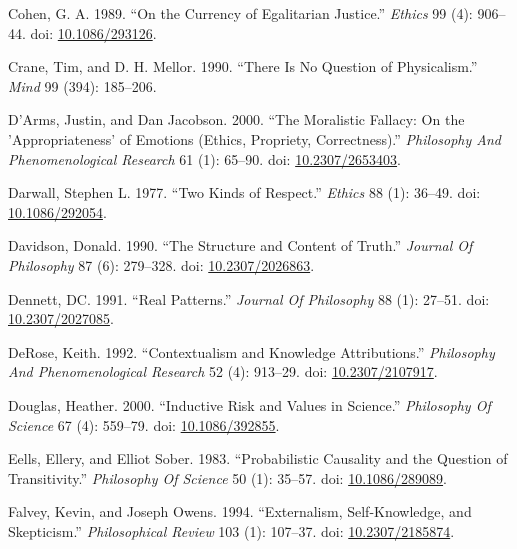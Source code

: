 \documentclass[
  10pt,
  letterpaper,
  DIV=11,
  numbers=noendperiod,
  twoside]{scrartcl}
\newlength{\cslhangindent}
\newenvironment{CSLReferences}[2] %
 {\begin{list}{}{%
  \setlength{\itemindent}{0pt}
  \setlength{\leftmargin}{0pt}
  \setlength{\parsep}{0pt}
  \ifodd #1
   \setlength{\leftmargin}{\cslhangindent}
   \setlength{\itemindent}{-1\cslhangindent}
  \fi
  \setlength{\itemsep}{#2\baselineskip}}}
 {\end{list}}
\begin{document}
\begin{CSLReferences}{1}{0}
Cohen, G. A. 1989. {``On the Currency of Egalitarian Justice.''}
\emph{Ethics} 99 (4): 906--44. doi:
\href{https://doi.org/10.1086/293126}{10.1086/293126}.

Crane, Tim, and D. H. Mellor. 1990. {``There Is No Question of
Physicalism.''} \emph{Mind} 99 (394): 185--206.

D'Arms, Justin, and Dan Jacobson. 2000. {``The Moralistic Fallacy: On
the 'Appropriateness' of Emotions (Ethics, Propriety, Correctness).''}
\emph{Philosophy And Phenomenological Research} 61 (1): 65--90. doi:
\href{https://doi.org/10.2307/2653403}{10.2307/2653403}.

Darwall, Stephen L. 1977. {``Two Kinds of Respect.''} \emph{Ethics} 88
(1): 36--49. doi: \href{https://doi.org/10.1086/292054}{10.1086/292054}.

Davidson, Donald. 1990. {``The Structure and Content of Truth.''}
\emph{Journal Of Philosophy} 87 (6): 279--328. doi:
\href{https://doi.org/10.2307/2026863}{10.2307/2026863}.

Dennett, DC. 1991. {``Real Patterns.''} \emph{Journal Of Philosophy} 88
(1): 27--51. doi:
\href{https://doi.org/10.2307/2027085}{10.2307/2027085}.

DeRose, Keith. 1992. {``Contextualism and Knowledge Attributions.''}
\emph{Philosophy And Phenomenological Research} 52 (4): 913--29. doi:
\href{https://doi.org/10.2307/2107917}{10.2307/2107917}.

Douglas, Heather. 2000. {``Inductive Risk and Values in Science.''}
\emph{Philosophy Of Science} 67 (4): 559--79. doi:
\href{https://doi.org/10.1086/392855}{10.1086/392855}.

Eells, Ellery, and Elliot Sober. 1983. {``Probabilistic Causality and
the Question of Transitivity.''} \emph{Philosophy Of Science} 50 (1):
35--57. doi: \href{https://doi.org/10.1086/289089}{10.1086/289089}.

Falvey, Kevin, and Joseph Owens. 1994. {``Externalism, Self-Knowledge,
and Skepticism.''} \emph{Philosophical Review} 103 (1): 107--37. doi:
\href{https://doi.org/10.2307/2185874}{10.2307/2185874}.


\end{CSLReferences}
\end{document}
